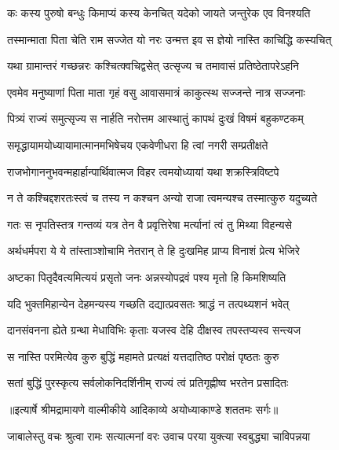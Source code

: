 \twolineshloka
{कः कस्य पुरुषो बन्धुः किमाप्यं कस्य केनचित्}
{यदेको जायते जन्तुरेक एव विनश्यति} %

\twolineshloka
{तस्मान्माता पिता चेति राम सज्जेत यो नरः}
{उन्मत्त इव स ज्ञेयो नास्ति काचिद्धि कस्यचित्} %

\twolineshloka
{यथा ग्रामान्तरं गच्छन्नरः कश्चित्क्वचिद्वसेत्}
{उत्सृज्य च तमावासं प्रतिष्ठेतापरेऽहनि} %

\twolineshloka
{एवमेव मनुष्याणां पिता माता गृहं वसु}
{आवासमात्रं काकुत्स्थ सज्जन्ते नात्र सज्जनाः} %

\twolineshloka
{पित्र्यं राज्यं समुत्सृज्य स नार्हति नरोत्तम}
{आस्थातुं कापथं दुःखं विषमं बहुकण्टकम्} %

\twolineshloka
{समृद्धायामयोध्यायामात्मानमभिषेचय}
{एकवेणीधरा हि त्वां नगरी सम्प्रतीक्षते} %

\twolineshloka
{राजभोगाननुभवन्महार्हान्पार्थिवात्मज}
{विहर त्वमयोध्यायां यथा शक्रस्त्रिविष्टपे} %

\twolineshloka
{न ते कश्चिद्दशरतःस्त्वं च तस्य न कश्चन}
{अन्यो राजा त्वमन्यश्च तस्मात्कुरु यदुच्यते} %

\twolineshloka
{गतः स नृपतिस्तत्र गन्तव्यं यत्र तेन वै}
{प्रवृत्तिरेषा मर्त्यानां त्वं तु मिथ्या विहन्यसे} %

\twolineshloka
{अर्थधर्मपरा ये ये तांस्ताञ्शोचामि नेतरान्}
{ते हि दुःखमिह प्राप्य विनाशं प्रेत्य भेजिरे} %

\twolineshloka
{अष्टका पितृदैवत्यमित्ययं प्रसृतो जनः}
{अन्नस्योपद्रवं पश्य मृतो हि किमशिष्यति} %

\twolineshloka
{यदि भुक्तमिहान्येन देहमन्यस्य गच्छति}
{दद्यात्प्रवसतः श्राद्धं न तत्पथ्यशनं भवेत्} %

\twolineshloka
{दानसंवनना ह्येते ग्रन्था मेधाविभिः कृताः}
{यजस्व देहि दीक्षस्व तपस्तप्यस्व सन्त्यज} %

\twolineshloka
{स नास्ति परमित्येव कुरु बुद्धिं महामते}
{प्रत्यक्षं यत्तदातिष्ठ परोक्षं पृष्ठतः कुरु} %

\twolineshloka
{सतां बुद्धिं पुरस्कृत्य सर्वलोकनिदर्शिनीम्}
{राज्यं त्वं प्रतिगृह्णीष्व भरतेन प्रसादितः} %


{॥इत्यार्षे श्रीमद्रामायणे वाल्मीकीये आदिकाव्ये अयोध्याकाण्डे शततमः सर्गः॥}


\twolineshloka
{जाबालेस्तु वचः श्रुत्वा रामः सत्यात्मनां वरः}
{उवाच परया युक्त्या स्वबुद्ध्या चाविपन्नया} %

